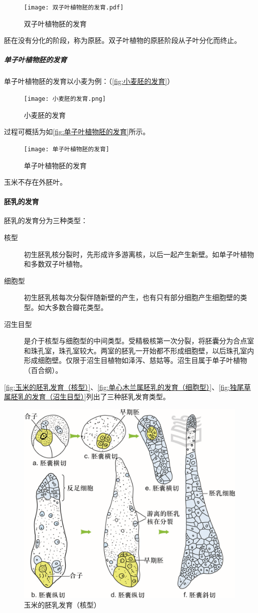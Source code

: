 \begin{figure}[htbp]
	\centering
	\texttt{[image: 双子叶植物胚的发育.pdf]}
	\caption{双子叶植物胚的发育}
	\label{fig:双子叶植物胚的发育}
\end{figure}

胚在没有分化的阶段，称为原胚。双子叶植物的原胚阶段从子叶分化而终止。

\subparagraph{单子叶植物胚的发育}

单子叶植物胚的发育以小麦为例：（\autoref{fig:小麦胚的发育}）

\begin{figure}[htbp]
	\centering
	\texttt{[image: 小麦胚的发育.png]}
	\caption{小麦胚的发育}
	\label{fig:小麦胚的发育}
\end{figure}

过程可概括为如\autoref{fig:单子叶植物胚的发育}所示。

\begin{figure}[htbp]
	\centering
	\texttt{[image: 单子叶植物胚的发育]}
	\caption{单子叶植物胚的发育}
	\label{fig:单子叶植物胚的发育}
\end{figure}

玉米不存在外胚叶。

\paragraph{胚乳的发育}

胚乳的发育分为三种类型：

\begin{description}
	\item[核型] 初生胚乳核分裂时，先形成许多游离核，以后一起产生新壁。如单子叶植物和多数双子叶植物。
	\item[细胞型] 初生胚乳核每次分裂伴随新壁的产生，也有只有部分细胞产生细胞壁的类型。如大多数合瓣花类型。
	\item[沼生目型] 是介于核型与细胞型的中间类型。受精极核第一次分裂，将胚囊分为合点室和珠孔室，珠孔室较大。两室的胚乳一开始都不形成细胞壁，以后珠孔室内形成细胞壁。仅限于沼生目植物如泽泻、慈姑等。沼生目属于单子叶植物（百合纲）。
\end{description}

\autoref{fig:玉米的胚乳发育（核型）}、\autoref{fig:单心木兰属胚乳的发育（细胞型）}、\autoref{fig:独尾草属胚乳的发育（沼生目型）}列出了三种胚乳发育类型。

\begin{figure}[htbp]
	\centering
	\includegraphics[width=0.5\linewidth]{Pics/玉米的胚乳发育（核型）}
	\caption{玉米的胚乳发育（核型）}
	\label{fig:玉米的胚乳发育（核型）}
\end{figure}


